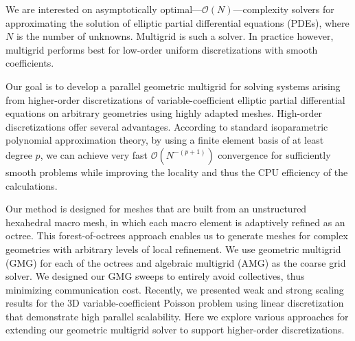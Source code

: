  
We are interested on asymptotically
optimal---$\mathcal{O}(N)$---complexity solvers for approximating the
solution of elliptic partial differential equations (PDEs), where $N$
is the number of unknowns.  Multigrid is such a solver. In practice
however, multigrid performs best for low-order uniform discretizations
with smooth coefficients. 

Our goal is to develop a parallel geometric multigrid for solving
systems arising from higher-order discretizations of
variable-coefficient elliptic partial differential equations on
arbitrary geometries using highly adapted meshes.
High-order discretizations offer several advantages.  According to
standard isoparametric polynomial approximation theory,
by using a finite element basis of at least degree $p$, we can achieve
very fast $\mathcal{O}(N^{-(p+1)})$ convergence for sufficiently
smooth problems while improving the locality and thus the CPU
efficiency of the calculations.

 Our method is designed for meshes that are built from an unstructured
hexahedral macro mesh, in which each macro element is adaptively
refined as an octree. This forest-of-octrees approach enables us to
generate meshes for complex geometries with arbitrary levels of local
refinement. We use geometric multigrid (GMG) for each of the octrees
and algebraic multigrid (AMG) as the coarse grid solver. We designed
our GMG sweeps to entirely avoid collectives, thus minimizing
communication cost. Recently, we presented weak and strong scaling
results for the 3D variable-coefficient Poisson problem using linear
discretization that demonstrate high parallel scalability. Here we
explore various approaches for extending our geometric multigrid
solver to support higher-order discretizations.



